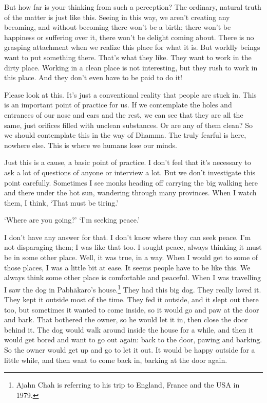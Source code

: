 But how far is your thinking from such a perception? The ordinary, natural truth of the matter is just like this. Seeing in this way, we aren't creating any becoming, and without becoming there won't be a birth; there won't be happiness or suffering over it, there won't be delight coming about. There is no grasping attachment when we realize this place for what it is. But worldly beings want to put something there. That's what they like. They want to work in the dirty place. Working in a clean place is not interesting, but they rush to work in this place. And they don't even have to be paid to do it!

Please look at this. It's just a conventional reality that people are stuck in. This is an important point of practice for us. If we contemplate the holes and entrances of our nose and ears and the rest, we can see that they are all the same, just orifices filled with unclean substances. Or are any of them clean? So we should contemplate this in the way of Dhamma. The truly fearful is here, nowhere else. This is where we humans lose our minds.

Just this is a cause, a basic point of practice. I don't feel that it's necessary to ask a lot of questions of anyone or interview a lot. But we don't investigate this point carefully. Sometimes I see monks heading off carrying the big  walking here and there under the hot sun, wandering through many provinces. When I watch them, I think, `That must be tiring.'

`Where are you going?' `I'm seeking peace.'

I don't have any answer for that. I don't know where they can seek peace. I'm not disparaging them; I was like that too. I sought peace, always thinking it must be in some other place. Well, it was true, in a way. When I would get to some of those places, I was a little bit at ease. It seems people have to be like this. We always think some other place is comfortable and peaceful. When I was travelling I saw the dog in Pabh\=akaro's house.\footnote{Ajahn Chah is referring to his trip to England, France and the USA in 1979.} They had this big dog. They really loved it. They kept it outside most of the time. They fed it outside, and it slept out there too, but sometimes it wanted to come inside, so it would go and paw at the door and bark. That bothered the owner, so he would let it in, then close the door behind it. The dog would walk around inside the house for a while, and then it would get bored and want to go out again: back to the door, pawing and barking. So the owner would get up and go to let it out. It would be happy outside for a little while, and then want to come back in, barking at the door again.

